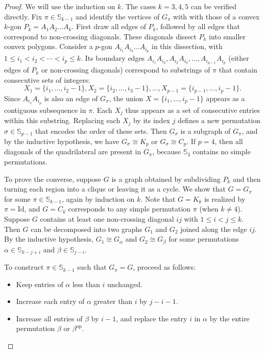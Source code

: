 \documentclass{birkjour}
\theoremstyle{definition}
\theoremstyle{remark}
\numberwithin{equation}{section}
\begin{document}
\begin{proof} We will use the induction on $k$.
The cases $k=3,4,5$ can be verified directly. Fix $\pi\in
\mathbb{S}_{k-1}$ and identify the vertices of $G_\pi$ with with
those of a convex $k$-gon $P_k=A_1A_2\ldots A_k$. First draw all
edges of $P_k$, followed by all edges that correspond to
non-crossing diagonals. These diagonals dissect $P_k$ into smaller
convex polygons. Consider a $p$-gon $A_{i_1}A_{i_2}\ldots A_{i_p}$
in this dissection, with $1\leq i_1<i_2<\cdots<i_p\leq k$. Its
boundary edges
$A_{i_1}A_{i_2},A_{i_2}A_{i_3},\ldots,A_{i_{p-1}}A_{i_p} $
 (either edges of $P_k$ or non-crossing
diagonals) correspond to substrings of $\pi$ that contain
consecutive sets of integers:
$$X_1=\{i_1,\ldots,i_2-1\},X_2=\{i_2,\ldots,i_3-1\},
\ldots,X_{p-1}=\{i_{p-1},\ldots,i_p-1\}.$$ Since $A_{i_1}A_{i_p}$
is also an edge of $G_\pi$, the union $X = \{i_1, \ldots, i_p -
1\}$ appears as a contiguous subsequence in $\pi$. Each $X_j$ thus
appears as a set of consecutive entries within this substring.
Replacing each $X_j$ by its index $j$ defines a new permutation
$\sigma \in \mathbb{S}_{p-1}$ that encodes the order of these
sets. Then $G_\sigma$ is a subgraph of $G_\pi$, and by the
inductive hypothesis, we have $G_\sigma \cong K_p$ or $G_\sigma
\cong C_p$. If $p = 4$, then all diagonals of the quadrilateral
are present in $G_\pi$, because $\mathbb{S}_3$ contains no simple
permutations.



To prove the converse, suppose $G$ is a graph obtained by
subdividing $P_k$ and then turning each region into a clique or
leaving it as a cycle. We show that $G = G_\pi$ for some $\pi \in
\mathbb{S}_{k-1}$, again by induction on $k$. Note that $G = K_k$
is realized by $\pi = \mathrm{Id}$, and $G = C_k$ corresponds to
any simple permutation $\pi$ (when $k \neq 4$). Suppose $G$
contains at least one non-crossing diagonal $ij$ with $1 \leq i <
j \leq k$. Then $G$ can be decomposed into two graphs $G_1$ and
$G_2$ joined along the edge $ij$. By the inductive hypothesis,
$G_1 \cong G_\alpha$ and $G_2 \cong G_\beta$ for some permutations
$\alpha \in \mathbb{S}_{k-j+i}$ and $\beta \in \mathbb{S}_{j-i}$.

To construct $\pi \in \mathbb{S}_{k-1}$ such that $G_\pi = G$,
proceed as follows:
\begin{itemize}
    \item[(1)] Keep entries of $\alpha$ less than $i$ unchanged.
    \item[(2)] Increase each entry of $\alpha$ greater than $i$ by $j - i - 1$.
    \item[(3)] Increase all entries of $\beta$ by $i - 1$, and replace
    the entry $i$ in $\alpha$ by the entire permutation
    $\beta$ or $\beta^{\mathrm{op}}$.
\end{itemize}


\end{proof}
\end{document}
